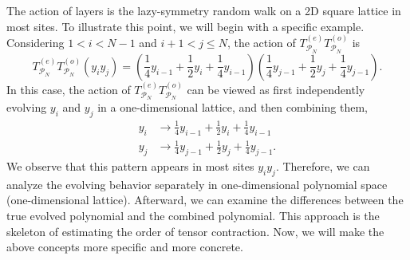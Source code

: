 \documentclass{article}
\begin{document}
\newcommand{\teto}{T^{(e)}_{\mathcal{P}_N}T^{(o)}_{\mathcal{P}_N}}
The action of layers is the lazy-symmetry random walk on a 2D square lattice in most sites. To illustrate this point, we will begin with a specific example. Considering $1<i<N-1$ and $i+1<j\leq N$, the action of $\teto$ is
\begin{equation}
    \label{eq: zz anonymous 5}
    \teto (y_iy_j) = \left(\frac{1}{4} y_{i-1} + \frac{1}{2}y_i + \frac{1}{4} y_{i-1}\right)\left( \frac{1}{4} y_{j-1} + \frac{1}{2}y_j + \frac{1}{4} y_{j-1} \right).
\end{equation}
In this case, the action of $\teto$ can be viewed as first independently evolving $y_i$ and $y_j$ in a one-dimensional lattice, and then combining them,
\begin{equation}
\label{eq: separate evolution}
    \begin{aligned}
        y_i &\to \frac{1}{4} y_{i-1} + \frac{1}{2}y_i + \frac{1}{4} y_{i-1}\\
    y_j &\to \frac{1}{4} y_{j-1} + \frac{1}{2}y_j + \frac{1}{4} y_{j-1}.
    \end{aligned}
\end{equation}
We observe that this pattern appears in most sites $y_iy_j$. Therefore, we can analyze the evolving behavior separately in one-dimensional polynomial space (one-dimensional lattice). Afterward, we can examine the differences between the true evolved polynomial and the combined polynomial. This approach is the skeleton of estimating the order of tensor contraction. Now, we will make the above concepts more specific and more concrete.
\end{document}
